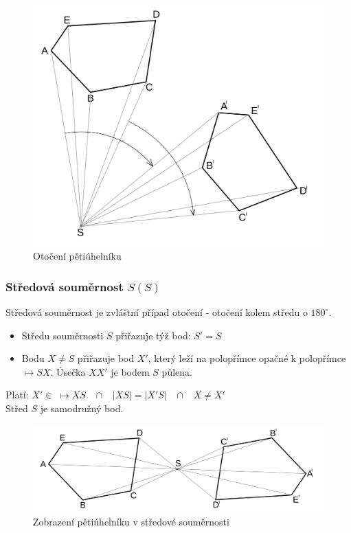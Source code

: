             \begin{figure}[H]
                \centering
                \includegraphics[width=0.5\linewidth]{img/19_otoceni.png}
                \caption{Otočení pětiúhelníku} 
                \label{fig:enter-label}
            \end{figure}
            
        \subsubsection{Středová souměrnost $S(S)$}
            Středová souměrnost je zvláštní případ otočení - otočení kolem středu o $180^{\circ}$.\\
            \begin{itemize}
                \item Středu souměrnosti $S$ přiřazuje týž bod: $S'=S$\\
                \item Bodu $X \neq S$ přiřazuje bod $X'$, který leží na polopřímce opačné k polopřímce $\mapsto SX$. Úsečka $XX'$ je bodem $S$ půlena.\\
            \end{itemize}
            Platí: $X' \in \; \mapsto XS \;\;\; \cap \;\;\; \left| XS \right| = \left| X'S \right| \;\;\; \cap \;\;\; X \neq X'$\\
            Střed $S$ je samodružný bod.

            \begin{figure}[H]
                \centering
                \includegraphics[width=0.5\linewidth]{img/19_stredova_soumernost.png}
                \caption{Zobrazení pětiúhelníku v středové souměrnosti} 
                \label{fig:enter-label}
            \end{figure}
            

